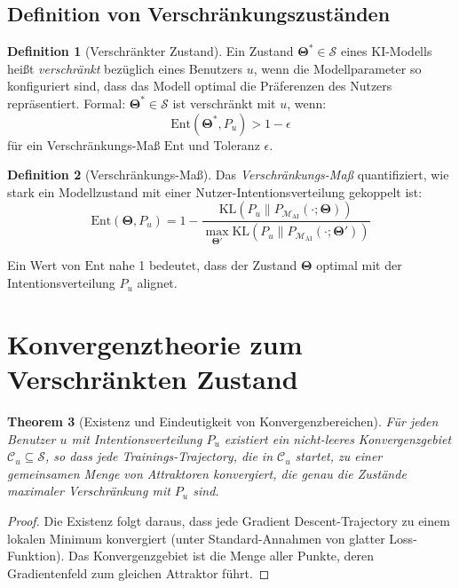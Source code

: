 \documentclass[12pt, a4paper]{article}
\newtheorem{theorem}{Theorem}[section]
\theoremstyle{definition}
\newtheorem{definition}[theorem]{Definition}
\theoremstyle{remark}
\newcommand{\vTheta}{\bm{\Theta}}
\newcommand{\KL}{\mathrm{KL}}
\newcommand{\Entangle}{\mathrm{Ent}}
\newcommand{\Model}{\mathcal{M}_{\mathrm{AI}}}
\begin{document}
\subsection{Definition von Verschränkungszuständen}
\label{subsec:def_entanglement}

\begin{definition}[Verschränkter Zustand]
\label{def:entangled_state}
Ein Zustand $\vTheta^* \in \mathcal{S}$ eines KI-Modells heißt \emph{verschränkt} bezüglich eines Benutzers $u$, wenn die Modellparameter so konfiguriert sind, dass das Modell optimal die Präferenzen des Nutzers repräsentiert. Formal: $\vTheta^* \in \mathcal{S}$ ist verschränkt mit $u$, wenn:
\[
  \Entangle(\vTheta^*, P_u) > 1 - \epsilon
\]
für ein Verschränkungs-Maß $\Entangle$ und Toleranz $\epsilon$.
\end{definition}

\begin{definition}[Verschränkungs-Maß]
\label{def:entangle_measure}
Das \emph{Verschränkungs-Maß} quantifiziert, wie stark ein Modellzustand mit einer Nutzer-Intentionsverteilung gekoppelt ist:
\[
  \Entangle(\vTheta, P_u) = 1 - \frac{\KL(P_u \| P_{\Model}(\cdot; \vTheta))}{\max_{\vTheta'} \KL(P_u \| P_{\Model}(\cdot; \vTheta'))}
\]

Ein Wert von $\Entangle$ nahe 1 bedeutet, dass der Zustand $\vTheta$ optimal mit der Intentionsverteilung $P_u$ alignet.
\end{definition}

\section{Konvergenztheorie zum Verschränkten Zustand}
\label{sec:konvergenz}

\begin{theorem}[Existenz und Eindeutigkeit von Konvergenzbereichen]
\label{thm:convergence_regions}
Für jeden Benutzer $u$ mit Intentionsverteilung $P_u$ existiert ein nicht-leeres Konvergenzgebiet $\mathcal{C}_u \subseteq \mathcal{S}$, so dass jede Trainings-Trajectory, die in $\mathcal{C}_u$ startet, zu einer gemeinsamen Menge von Attraktoren konvergiert, die genau die Zustände maximaler Verschränkung mit $P_u$ sind.
\end{theorem}

\begin{proof}
Die Existenz folgt daraus, dass jede Gradient Descent-Trajectory zu einem lokalen Minimum konvergiert (unter Standard-Annahmen von glatter Loss-Funktion). Das Konvergenzgebiet ist die Menge aller Punkte, deren Gradientenfeld zum gleichen Attraktor führt.
\end{proof}
\end{document}
